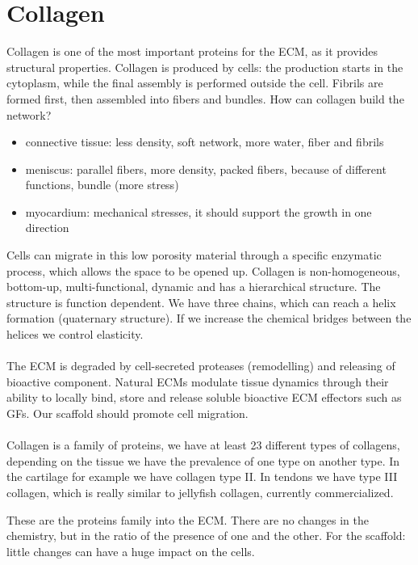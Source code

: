 
\section{Collagen}
Collagen is one of the most important proteins for the ECM, as it provides structural properties. Collagen is produced by cells: the production starts in the cytoplasm,  while the final assembly is performed outside the cell.
Fibrils are formed first, then assembled into fibers and bundles.
\noindent
How can collagen build the network?
\begin{itemize}
\item connective tissue: less density, soft network, more water, fiber and fibrils
\item meniscus: parallel fibers, more density, packed fibers, because of different functions, bundle (more stress)
\item myocardium: mechanical stresses, it should support the growth in one direction
\end{itemize}
\noindent
Cells can migrate in this low porosity material through a specific enzymatic process,  which allows the space to be opened up. 
Collagen is non-homogeneous, bottom-up, multi-functional, dynamic and has a hierarchical structure. The structure is function dependent. 
We have three chains,  which can reach a helix formation (quaternary structure). If we increase the chemical bridges between the helices we control elasticity.
\\
\\
\noindent
The ECM is degraded by cell-secreted proteases (remodelling) and releasing of bioactive component. 
Natural ECMs modulate tissue dynamics through their ability to locally bind, store and release soluble bioactive ECM effectors such as GFs. 
Our scaffold should promote cell migration.
\\
\\
\noindent
Collagen is a family of proteins, we have at least 23 different types of collagens, depending on the tissue we have the prevalence of one type on another type. In the cartilage for example we have collagen type II. In tendons we have type III collagen, which is really similar to jellyfish collagen, currently commercialized.

These are the proteins family into the ECM. 
There are no changes in the chemistry, but in the ratio of the presence of one and the other. 
For the scaffold: little changes can have a huge impact on the cells. 

